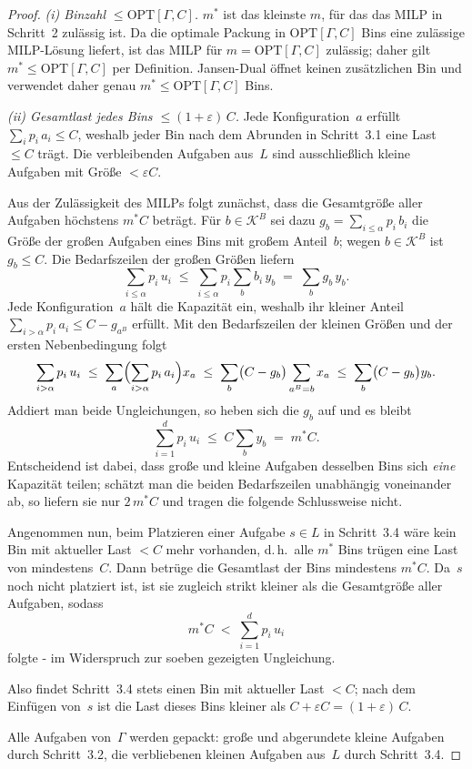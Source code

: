 \begin{proof}
\textit{(i) Binzahl $\le \mathrm{OPT}[\Gamma, C]$.}\;
$m^*$ ist das kleinste $m$, für das das MILP in Schritt~2 zulässig ist.
Da die optimale Packung in $\mathrm{OPT}[\Gamma, C]$ Bins eine zulässige MILP-Lösung liefert,
ist das MILP für $m = \mathrm{OPT}[\Gamma, C]$ zulässig; daher gilt $m^* \le \mathrm{OPT}[\Gamma, C]$ per Definition.
Jansen-Dual öffnet keinen zusätzlichen Bin und verwendet daher genau $m^* \le \mathrm{OPT}[\Gamma, C]$ Bins.

\textit{(ii) Gesamtlast jedes Bins $\le (1+\varepsilon)\, C$.}\;
Jede Konfiguration~$a$ erfüllt $\sum_i p_i\, a_i \le C$,
weshalb jeder Bin nach dem Abrunden in Schritt~3.1 eine Last $\le C$ trägt.
Die verbleibenden Aufgaben aus~$L$ sind ausschließlich kleine Aufgaben mit Größe $< \varepsilon C$.

Aus der Zulässigkeit des MILPs folgt zunächst, dass die Gesamtgröße aller Aufgaben höchstens
$m^* C$ beträgt.
Für $b \in \mathcal{K}^B$ sei dazu $g_b = \sum_{i \le \alpha} p_i\, b_i$ die Größe der großen
Aufgaben eines Bins mit großem Anteil~$b$; wegen $b \in \mathcal{K}^B$ ist $g_b \le C$.
Die Bedarfszeilen der großen Größen liefern
\[
  \sum_{i \le \alpha} p_i\, u_i \;\le\; \sum_{i \le \alpha} p_i \sum_{b} b_i\, y_b
  \;=\; \sum_{b} g_b\, y_b .
\]
Jede Konfiguration~$a$ hält die Kapazität ein, weshalb ihr kleiner Anteil
$\sum_{i > \alpha} p_i\, a_i \le C - g_{a^B}$ erfüllt.
Mit den Bedarfszeilen der kleinen Größen und der ersten Nebenbedingung folgt
\[
  \sum_{i > \alpha} p_i\, u_i
  \;\le\; \sum_{a} \Bigl( \sum_{i > \alpha} p_i\, a_i \Bigr) x_{a}
  \;\le\; \sum_{b} \bigl( C - g_b \bigr) \sum_{a^B = b} x_{a}
  \;\le\; \sum_{b} \bigl( C - g_b \bigr) y_b .
\]
Addiert man beide Ungleichungen, so heben sich die $g_b$ auf und es bleibt
\[
  \sum_{i=1}^{d} p_i\, u_i \;\le\; C \sum_{b} y_b \;=\; m^* C .
\]
Entscheidend ist dabei, dass große und kleine Aufgaben desselben Bins sich \emph{eine} Kapazität
teilen; schätzt man die beiden Bedarfszeilen unabhängig voneinander ab, so liefern sie nur
$2\, m^* C$ und tragen die folgende Schlussweise nicht.

Angenommen nun, beim Platzieren einer Aufgabe $s \in L$ in Schritt~3.4 wäre kein Bin
mit aktueller Last $< C$ mehr vorhanden, d.\,h.\ alle $m^*$ Bins trügen eine Last von mindestens~$C$.
Dann betrüge die Gesamtlast der Bins mindestens $m^* C$.
Da~$s$ noch nicht platziert ist, ist sie zugleich strikt kleiner als die Gesamtgröße aller
Aufgaben, sodass
\[
  m^* C \;<\; \sum_{i=1}^{d} p_i\, u_i
\]
folgte - im Widerspruch zur soeben gezeigten Ungleichung.

Also findet Schritt~3.4 stets einen Bin mit aktueller Last $< C$;
nach dem Einfügen von~$s$ ist die Last dieses Bins kleiner als $C + \varepsilon C = (1+\varepsilon)\, C$.

Alle Aufgaben von~$\Gamma$ werden gepackt: große und abgerundete kleine Aufgaben durch Schritt~3.2,
die verbliebenen kleinen Aufgaben aus~$L$ durch Schritt~3.4.
\end{proof}


